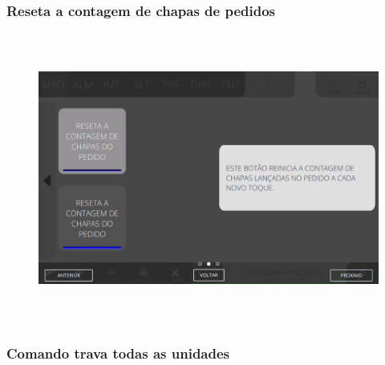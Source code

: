 \vspace*{\fill}

\newpage
\thispagestyle{fancy}

\vspace*{40 pt}

\subsubsection{\small{Reseta a contagem de chapas de pedidos}}\label{telaComandosMaquinaSegundaTelaComandosDeMaquinaResetaAContagemDeChapasDePedidos}

\vspace*{\fill}

\begin{figure}[h]
  \centering
  \includegraphics[width=576px,height=360px]{src/imagesMiniline/02-Machine/commands/e2.png}
\end{figure}

\vspace*{\fill}

\newpage
\thispagestyle{fancy}

\vspace*{40 pt}

\subsubsection{\small{Comando trava todas as unidades}}\label{telaComandosMaquinaSegundaTelaComandosDeMaquinaComandoTravaTodasAsUnidades}

\vspace*{\fill}

